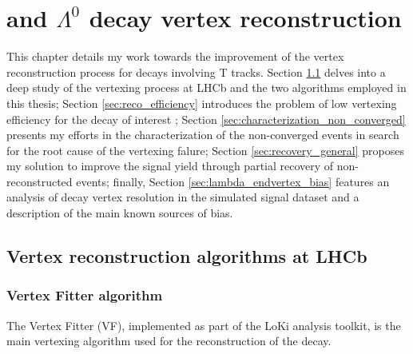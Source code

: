 \chapter{\texorpdfstring{\lbz}{Lambdab} and \texorpdfstring{$\Lambda^0$}{Lambda} decay vertex reconstruction}
\label{cap:vertex_reconstruction}
This chapter details my work towards the improvement of the vertex reconstruction process for decays involving T tracks.
Section \ref{sec:reco_algorithms} delves into a deep study of the vertexing process at LHCb and the two algorithms employed in this thesis;
Section \ref{sec:reco_efficiency} introduces the problem of low vertexing efficiency for the decay of interest \demonstratorshort;
Section \ref{sec:characterization_non_converged} presents my efforts in the characterization of the non-converged events in search for the root cause of the vertexing falure;
Section \ref{sec:recovery_general} proposes my solution to improve the signal yield through partial recovery of non-reconstructed events;
finally, Section \ref{sec:lambda_endvertex_bias} features an analysis of \lambdadecay decay vertex resolution in the simulated signal dataset and a description of the main known sources of bias.

\section{Vertex reconstruction algorithms at LHCb}
\label{sec:reco_algorithms}

\subsection{Vertex Fitter algorithm}
The Vertex Fitter (VF), implemented as part of the LoKi analysis toolkit, is the main vertexing algorithm used for the reconstruction of the \lbz decay.

